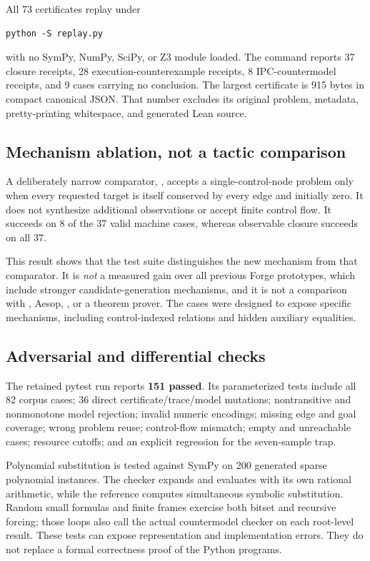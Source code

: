 All 73 certificates replay under
\begin{lstlisting}
python -S replay.py
\end{lstlisting}
with no SymPy, NumPy, SciPy, or Z3 module loaded. The command reports 37 closure
receipts, 28 execution-counterexample receipts, 8 IPC-countermodel receipts,
and 9 cases carrying no conclusion. The largest certificate is 915 bytes in
compact canonical JSON. That number excludes its original problem, metadata,
pretty-printing whitespace, and generated Lean source.

\subsection{Mechanism ablation, not a tactic comparison}
A deliberately narrow comparator, , accepts a
single-control-node problem only when every requested target is itself
conserved by every edge and initially zero. It does not synthesize additional
observations or accept finite control flow. It succeeds on 8 of the 37 valid
machine cases, whereas observable closure succeeds on all 37.

This result shows that the test suite distinguishes the new mechanism from
that comparator. It is \emph{not} a measured gain over all previous Forge
prototypes, which include stronger candidate-generation mechanisms, and it is
not a comparison with , Aesop, , or a theorem
prover. The cases were designed to expose specific mechanisms, including
control-indexed relations and hidden auxiliary equalities.

\subsection{Adversarial and differential checks}
The retained pytest run reports \textbf{151 passed}. Its parameterized tests
include all 82 corpus cases; 36 direct certificate/trace/model mutations;
nontransitive and nonmonotone model rejection; invalid numeric encodings;
missing edge and goal coverage; wrong problem reuse; control-flow mismatch;
empty and unreachable cases; resource cutoffs; and an explicit regression for
the seven-sample trap.

Polynomial substitution is tested against SymPy on 200 generated sparse
polynomial instances. The checker expands and evaluates with its own rational
arithmetic, while the reference computes simultaneous symbolic substitution.
Random small formulas and finite frames exercise both bitset and recursive
forcing; those loops also call the actual countermodel checker on each
root-level result. These tests can expose representation and implementation
errors. They do not replace a formal correctness proof of the Python programs.


